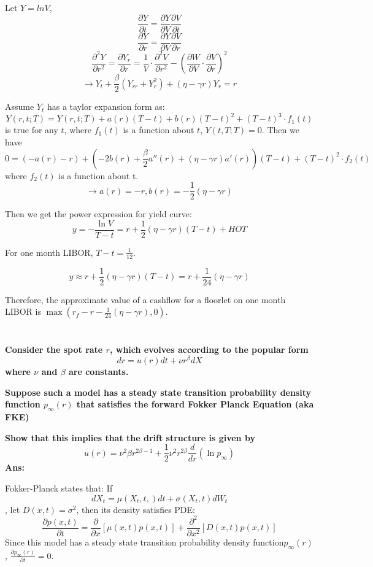 \documentclass[11pt, notitlepage]{article}
\begin{document}
Let $Y = lnV$,
$$ \frac{\partial Y}{\partial t} = \frac{\partial Y}{\partial V}\frac{\partial V}{\partial t}$$
$$ \frac{\partial Y}{\partial r} = \frac{\partial Y}{\partial V}\frac{\partial V}{\partial r}$$
$$ \frac{\partial ^2 Y}{\partial r^2} = \frac{\partial Y_r}{\partial r} = \frac{1}{V}\cdot \frac{\partial^2 V}{\partial r^2} - (\frac{\partial W}{\partial V} \cdot \frac{\partial V }{\partial r})^2$$
$$ \to Y_t + \frac{\beta}{2} (Y_{rr} + Y_r ^2) + (\eta-\gamma r)Y_r = r$$

Assume $Y_t$ has a taylor expansion form as:
$$ Y(r,t;T) = Y(r,t;T) + a(r)(T-t) + b(r)(T-t)^2 + (T-t)^3 \cdot f_1(t)$$ is true for any $t$, where $f_1(t)$ is a function about $t$, $Y(t,T;T) = 0$. Then we have
$$ 0 = (-a(r) -r) + (-2b(r) + \frac{\beta}{2}a''(r) + (\eta -\gamma r)a'(r)) (T-t) + (T-t)^2 \cdot f_2(t)$$
where $f_2(t)$ is a function about t. 
$$\to a(r) = -r, b(r) = -\frac{1}{2}(\eta - \gamma r)$$

Then we get the power expression for yield curve:
$$ y = -\frac{\ln V}{T-t} = r +\frac{1}{2}(\eta - \gamma r)(T-t) + HOT$$

For one month LIBOR, $T-t = \frac{1}{12}$.

$$ y \approx r+\frac{1}{2}(\eta - \gamma r)(T-t) = r +\frac{1}{24} (\eta - \gamma r)$$

Therefore, the approximate value of a cashflow for a floorlet on one month LIBOR is $\max(r_f - r -\frac{1}{24}(\eta - \gamma r), 0)$.


\newpage
\section{}
\color{red}
\textbf{Consider the spot rate $r$, which evolves according to the popular form
$$dr = u(r) dt + \nu r^\beta dX$$
where $\nu$ and $\beta$ are constants. }

\textbf{Suppose such a model has a steady state transition probability density function $p_\infty(r)$ that satisfies the forward Fokker Planck Equation (aka FKE)}

\textbf{Show that this implies that the drift structure is given by
$$ u(r) = \nu ^2 \beta r^{2\beta-1} + \frac{1}{2} \nu^2 r^{2\beta} \frac{d}{dr}(\ln p_\infty)$$}
\vspace{5mm}
\color{black}
\textbf {Ans:}

Fokker-Planck states that: If
$$dX_t = \mu(X_t,t,)dt + \sigma(X_t,t)dW_t$$
, let $D(x,t) = \sigma^2$, then its density satisfies PDE:
$$\frac{\partial p(x,t)}{\partial t} = \frac{\partial}{\partial x} [\mu(x,t)p(x,t)] + \frac{\partial^2}{\partial x^2}[D(x,t) p(x,t)]$$
Since this model has a steady state transition probability density function$p_\infty(r)$, $\frac{\partial p_\infty(r)}{\partial t} = 0$.
\end{document}
